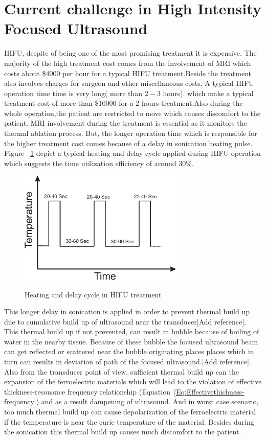 \section{Current challenge in High Intensity Focused Ultrasound}
HIFU, despite of being one of the most promising treatment it is expensive. The majority of the high treatment cost comes from the involvement of MRI which costs about \$4000 per hour for a typical HIFU treatment.Beside the treatment also involves charges for surgeon and other miscellaneous costs. A typical HIFU operation time time is very long( more than $2-3$ hours).  which make a typical treatment cost of more than \$10000 for a 2 hours treatment.Also during the whole operation,the patient are restricted to move which causes discomfort to the patient. MRI involvement during the treatment is essential as it monitors the thermal ablation process. But, the longer operation time which is responsible for the higher treatment cost comes because of a delay in sonication heating pulse. Figure ~\ref{fig:Heating and Cooling pulse in HIFU treatment} depict a typical heating and delay cycle applied during HIFU operation which suggests the time utilization efficiency of around $30$\%.\begin{figure}[t]
\centering
	\includegraphics[width=0.7\textwidth]{HeatingandCoolingpulse.eps}\\
	\caption[Heating and delay cycle in HIFU treatment]{Heating and delay cycle in HIFU treatment}\label{fig:Heating and Cooling pulse in HIFU treatment}
\end{figure} This longer delay in sonication is applied in order to prevent thermal build up due to cumulative build up of ultrasound  near the transducer[Add reference]. This thermal build up if not prevented, can result in bubble because of boiling of water in the nearby tissue. Because of these bubble the focused ultrasound beam can get reflected or scattered near the bubble originating places places which in turn can results in deviation of path of the focused ultrasound.[Add reference]. Also from the transducer point of view, sufficient thermal build up can the expansion of the ferroelectric materials which will lead to the violation of  effective thickness-resonance frequency relationship (Equation~\ref{Eq:Effectivethichness-frequency})  and as a result dampening of ultrasound. And in worst case scenario, too much thermal build up can cause depolarization of the ferroelectric material if the temperature is near the curie temperature of the material. Besides during the sonication this thermal build up causes much discomfort to the patient.

